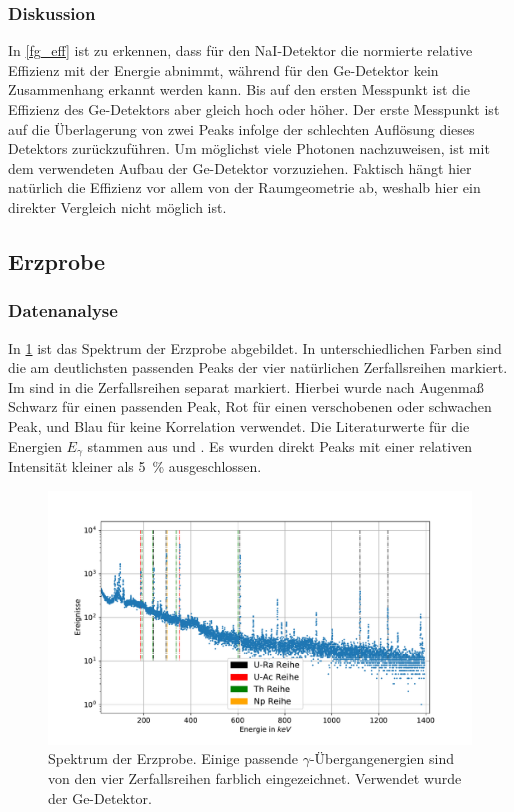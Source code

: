 \documentclass[
	a4paper,
	12pt,
	pagesize,
	ngerman
]{scrartcl}
\begin{document}
\subsubsection{Diskussion}

In \cref{fg_eff} ist zu erkennen, dass für den NaI-Detektor die normierte relative Effizienz mit der Energie abnimmt, während für den Ge-Detektor kein Zusammenhang erkannt werden kann.
Bis auf den ersten Messpunkt ist die Effizienz des Ge-Detektors aber gleich hoch oder höher.
Der erste Messpunkt ist auf die Überlagerung von zwei Peaks infolge der schlechten Auflösung dieses Detektors zurückzuführen.
Um möglichst viele Photonen nachzuweisen, ist mit dem verwendeten Aufbau der Ge-Detektor vorzuziehen.
Faktisch hängt hier natürlich die Effizienz vor allem von der Raumgeometrie ab, weshalb hier ein direkter Vergleich nicht möglich ist.

\subsection{Erzprobe}
\subsubsection{Datenanalyse}
	In \cref{fg_erz} ist das Spektrum der Erzprobe abgebildet.
	In unterschiedlichen Farben sind die am deutlichsten passenden Peaks der vier natürlichen Zerfallsreihen markiert.
	Im  sind in  die Zerfallsreihen separat markiert.
	Hierbei wurde nach Augenmaß Schwarz für einen passenden Peak, Rot für einen verschobenen oder schwachen Peak, und Blau für keine Korrelation verwendet.
	Die Literaturwerte für die Energien $E_\gamma$ stammen aus \cite{erze1} und \cite{erze2}.
	Es wurden direkt Peaks mit einer relativen Intensität kleiner als \SI{5}{\percent} ausgeschlossen.

	\begin{figure}[H]
			\includegraphics[width= 1 \linewidth]{img/erz_alles}
			\caption{
			Spektrum der Erzprobe. Einige passende $\gamma$-Übergangenergien sind von den vier Zerfallsreihen farblich eingezeichnet. Verwendet wurde der Ge-Detektor.
			}
			\label{fg_erz}
	\end{figure}
\end{document}

